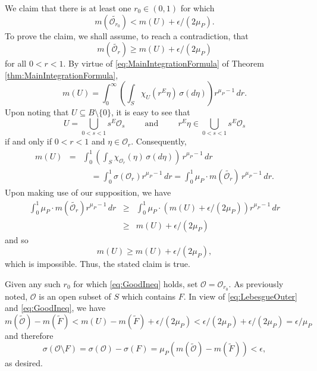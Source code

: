 \documentclass[smallextended]{svjour3}
\theoremstyle{remark}
\renewenvironment{proof}[1][\proofname]{\renewcommand\xproofname{#1}\xproof}{\endxproof}
\begin{document}
\begin{proof}
We claim that there is at least one $r_0\in (0,1)$ for which 
\begin{equation}\label{eq:GoodIneq}
m(\widetilde{\mathcal{O}_{r_0}})< m(U)+\epsilon/(2\mu_P).
\end{equation}
To prove the claim, we shall assume, to reach a contradiction, that 
\begin{equation*}
m(\widetilde{\mathcal{O}_{r}})\geq m(U)+\epsilon/(2\mu_P)
\end{equation*}
for all $0<r<1$. By virtue of \eqref{eq:MainIntegrationFormula} of Theorem \ref{thm:MainIntegrationFormula},
\begin{equation*}
m(U)=\int_{0}^\infty\left(\int_S \chi_{U}(r^E\eta)\,\sigma(d\eta)\right)r^{\mu_P-1}\,dr.
\end{equation*}
Upon noting that $U\subseteq B\setminus\{0\}$, it is easy to see that
\begin{equation*}
U=\bigcup_{0<s<1}s^E\mathcal{O}_s
\hspace{1cm}\mbox{and}\hspace{1cm}
r^E\eta\in \bigcup_{0<s<1}s^E\mathcal{O}_s
\end{equation*}
if and only if $0<r<1$ and $\eta\in \mathcal{O}_r$. Consequently,
\begin{eqnarray*}
m(U)&=&\int_0^1\left(\int_S\chi_{\mathcal{O}_r}(\eta)\,\sigma(d\eta)\right)\,r^{\mu_P-1}\,dr\\
&&\quad =\int_0^1\sigma(\mathcal{O}_r)r^{\mu_P-1}\,dr=\int_0^1 \mu_P\cdot m(\widetilde{\mathcal{O}_r})\,r^{\mu_P-1}\,dr.
\end{eqnarray*}
Upon making use of our supposition, we have
\begin{eqnarray*}
\int_0^1\mu_P\cdot m(\widetilde{\mathcal{O}_r})r^{\mu_P-1}\,dr&\geq& \int_0^1\mu_P\cdot (m(U)+\epsilon/(2\mu_P))r^{\mu_P-1}\,dr\\
&\geq &m(U)+\epsilon/(2\mu_P)
\end{eqnarray*}
and so
\begin{equation*}
m(U)\geq m(U)+\epsilon/(2\mu_P),
\end{equation*}
which is impossible. Thus, the stated claim is true.

Given any such $r_0$ for which \eqref{eq:GoodIneq} holds, set $\mathcal{O}=\mathcal{O}_{r_0}$. As previously noted, $\mathcal{O}$ is an open subset of $S$ which contains $F$. In view of \eqref{eq:LebesgueOuter} and \eqref{eq:GoodIneq}, we have
\begin{equation*}
m(\widetilde{\mathcal{O}})-m(\widetilde{F})<m(U)-m(\widetilde{F})+\epsilon/(2\mu_P)<\epsilon/(2\mu_P)+\epsilon/(2\mu_P)=\epsilon/\mu_P
\end{equation*}
and therefore
\begin{equation*}
\sigma(\mathcal{O}\setminus F)=\sigma(\mathcal{O})-\sigma(F)=\mu_P(m(\widetilde{\mathcal{O}})-m(\widetilde{F}))<\epsilon,
\end{equation*}
as desired.
\end{proof}
\end{document}
